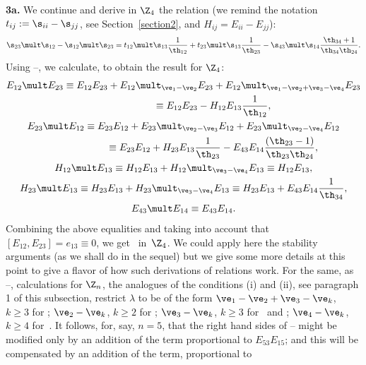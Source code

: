 {\bf 3a.} We continue and derive in $\Z_4$ the relation (we remind the notation $t_{ij}:=\s_{ii}-\s_{jj}$,
see Section~\ref{section2},
and $H_{ij}=E_{ii}-E_{jj}$):
\begin{gather} \label{proof12}
\s_{23}\mult\s_{12}-\s_{12}\mult\s_{23}=t_{12}\mult\s_{13}
 \frac{1}{\th_{12}}+t_{23}\mult\s_{13}  \frac{1}{\th_{23}}-\s_{43}\mult\s_{14}  \frac{\th_{34}+1}{\th_{34}\th_{24}}  .
\end{gather}
Using --, we calculate, to obtain the result for $\Z_4$:
\begin{gather}E_{12}\mult E_{23} \equiv E_{12}E_{23}+ E_{12}\mult_{\ve_1-\ve_2} E_{23}+
E_{12}\mult_{\ve_1-\ve_2+\ve_3-\ve_4} E_{23} \nonumber\\
\phantom{E_{12}\mult E_{23}}{}
 \equiv E_{12}E_{23}-H_{12}E_{13} \frac{1}{\th_{12}}  ,\label{1223r1}\\
  E_{23}\mult E_{12} \equiv E_{23}E_{12}+ E_{23}\mult_{\ve_2-\ve_3} E_{12}+
E_{23}\mult_{\ve_2-\ve_4} E_{12}\notag\\
\phantom{E_{23}\mult E_{12}}{} \equiv E_{23}E_{12}+H_{23}E_{13}  \frac{1}{\th_{23}}-E_{43}E_{14} \frac{(\th_{23}-1)}{\th_{23}
\th_{24}} ,\label{1223r2}\\
  H_{12}\mult E_{13} \equiv H_{12} E_{13}+H_{12}\mult_{\ve_3-\ve_4} E_{13}\equiv
H_{12} E_{13}  ,\label{1223r3}\\
  H_{23}\mult E_{13} \equiv H_{23} E_{13}+H_{23}\mult_{\ve_3-\ve_4} E_{13}\equiv
H_{23} E_{13}+E_{43}E_{14}  \frac{1}{\th_{34}}  ,\label{1223r4}\\
  E_{43}\mult E_{14} \equiv E_{43}E_{14} .\label{1223r5}
  \end{gather}
Combining the above equalities and taking into account that $[E_{12},E_{23}]=e_{13}\equiv 0$,
we get~ in~$\Z_4$. We could apply here the stability arguments (as we shall do in the sequel)
but we give some more details at this point to give a f\/lavor of how such derivations of relations work.
For the same, as --, calculations for $\Z_n$, the analogues of the conditions (i)
and (ii), see paragraph 1 of this subsection, restrict $\lambda$ to be of the form $\ve_1-\ve_2+\ve_3-\ve_k$, $k\geq 3$ for
; $\ve_2-\ve_k$, $k\geq 2$ for ; $\ve_3-\ve_k$, $k\geq 3$ for~
and ; $\ve_4-\ve_k$, $k\geq 4$ for~. It follows, for, say, $n=5$, that the right
hand sides of -- might be modif\/ied only by an addition of the term proportional to
$E_{53}E_{15}$; and this will be compensated by an addition of the term, proportional to
